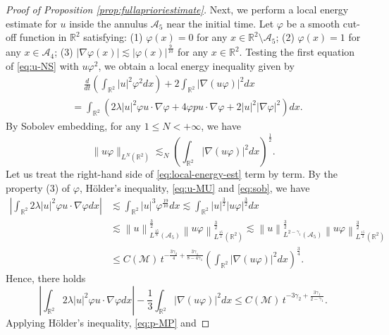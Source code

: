 \documentclass[12pt,reqno]{amsart}
\theoremstyle{plain}
\theoremstyle{definition}
\newcommand{\R}{\mathbb{R}}
\newcommand{\M}{\mathcal{M}}
\newcommand{\A}{\mathcal{A}}
\renewcommand{\:}{\colon}
\numberwithin{equation}{section}
\numberwithin{figure}{section}
\begin{document}
\begin{proof}[Proof of Proposition \ref{prop:fullaprioriestimate}]
Next, we perform a local energy estimate for $u$ inside the annulus $\A_5$ near the initial time. Let  $\varphi$ be a smooth cut-off function in $\R^2$ satisfying: (1) $\varphi(x) = 0$ for any $x \in \R^2 \setminus \A_5$; (2)  $\varphi(x)=1$ for any $x \in \A_4$; (3) $|\nabla \varphi(x)|  \lesssim |\varphi(x)|^{\frac{9}{10}}$ for any $x \in \R^2$. Testing the first equation of \eqref{eq:u-NS} with $u\varphi^2$, we obtain a local energy inequality given by
\begin{align} \label{eq:local-energy-est}
    &\quad \   \frac{d}{dt} \left(\int_{\R^2} |u|^2 \varphi^2 dx \right) +  2\int_{\R^2} |\nabla (u\varphi)|^2  dx \nonumber \\
    &=   \int_{\R^2} \left( 2 \lambda |u|^2 \varphi u \cdot \nabla \varphi  + 4 \varphi p u \cdot \nabla \varphi   + 2 |u|^2 |\nabla \varphi|^2  \right) dx.
\end{align}
By Sobolev embedding, for any $1\le N<+\infty$, we have
\begin{equation} \label{eq:sob}
    \|u\varphi\|_{L^N(\R^2)} \lesssim_N \left(\int_{\R^2} |\nabla (u \varphi)|^2 dx\right)^\frac12.
\end{equation}
Let us treat the right-hand side of \eqref{eq:local-energy-est} term by term. By the property (3) of $\varphi$, H\"older's inequality, \eqref{eq:u-MU} and \eqref{eq:sob}, we have
\begin{align} \label{eq:822-1}
    \left|\int_{\R^2} 2 \lambda |u|^2 \varphi u \cdot \nabla \varphi dx \right| &\lesssim \int_{\R^2}  |u|^3 \varphi^{\frac{19}{10}} dx \lesssim \int_{\R^2}  |u|^\frac32 |u \varphi|^\frac32  dx  \nonumber \\
    &\lesssim \left\|u\right\|^{\frac{3}{2}}_{L^{\frac{15}{8}}(\A_5)} \left\|u \varphi\right\|^{\frac{3}{2}}_{L^{\frac{15}{2}}(\R^2)}  \lesssim \left\|u\right\|^{\frac{3}{2}}_{L^{2-\gamma_1}(\A_5)} \left\|u \varphi\right\|^{\frac{3}{2}}_{L^{\frac{15}{2}}(\R^2)} \nonumber \\
    &\le C(\M) \, t^{-\frac{{3\gamma_2}}{4} + \frac{{3\gamma_1}}{8-4{\gamma_1}}} \left(\int_{\R^2} |\nabla (u \varphi)|^2 dx\right)^{\frac{3}{4}}.  
\end{align}
Hence, there holds
\begin{equation} \label{eq:nice-est-1}
	\left|\int_{\R^2} 2 \lambda |u|^2 \varphi u \cdot \nabla \varphi dx \right| - \frac{1}{3} \int_{\R^2} |\nabla (u \varphi)|^2 dx \le C(\M) \, t^{-3\gamma_2 + \frac{{3\gamma_1}}{2-{\gamma_1}}}.
\end{equation}
Applying H\"older's inequality, \eqref{eq:p-MP} and

\end{proof}
\end{document}
